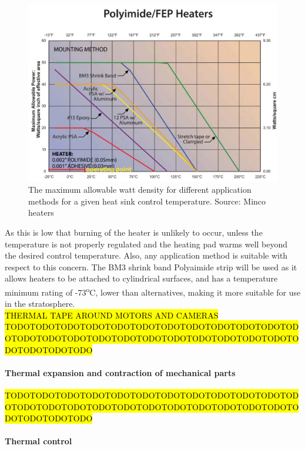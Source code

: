 	\begin{figure}[h!]
    \centering
    \includegraphics[scale=0.6]{4-experiment-design/img/mechanical/wattdensity.JPG}
	\caption{The maximum allowable watt density for different application methods for a given heat sink control temperature. Source: Minco heaters}
	\label{fig:thermalresistance1}
	\end{figure}

As this is low that burning of the heater is unlikely to occur, unless the temperature is not properly regulated and the heating pad warms well beyond the desired control temperature. Also, any application method is suitable with respect to this concern. The BM3 shrink band Polyaimide strip will be used as it allows heaters to be attached to cylindrical surfaces, and has a temperature minimum rating of -73\textsuperscript{o}C, lower than alternatives, making it more suitable for use in the stratosphere. \\

\hl{THERMAL TAPE AROUND MOTORS AND CAMERAS TODOTODOTODOTODOTODOTODOTODOTODOTODOTODOTODOTODOTODOTODOTODOTODOTODOTODOTODOTODOTODOTODOTODOTODOTODOTODOTODO}

\paragraph{Thermal expansion and contraction of mechanical parts}

\hl{TODOTODOTODOTODOTODOTODOTODOTODOTODOTODOTODOTODOTODOTODOTODOTODOTODOTODOTODOTODOTODOTODOTODOTODOTODOTODOTODO}


\paragraph{Thermal control}

